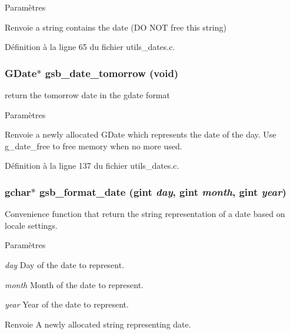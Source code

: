 \begin{DoxyParams}{Paramètres}
\item[{\em }]\end{DoxyParams}
\begin{DoxyReturn}{Renvoie}
a string contains the date (DO NOT free this string) 
\end{DoxyReturn}


Définition à la ligne 65 du fichier utils\_\-dates.c.

\subsubsection[{gsb\_\-date\_\-tomorrow}]{\setlength{\rightskip}{0pt plus 5cm}GDate$\ast$ gsb\_\-date\_\-tomorrow (void)}\label{utils__dates_8c_a527126308515106069bf3e5b2fc100ef}
return the tomorrow date in the gdate format


\begin{DoxyParams}{Paramètres}
\item[{\em }]\end{DoxyParams}
\begin{DoxyReturn}{Renvoie}
a newly allocated GDate which represents the date of the day. Use g\_\-date\_\-free to free memory when no more used. 
\end{DoxyReturn}


Définition à la ligne 137 du fichier utils\_\-dates.c.

\subsubsection[{gsb\_\-format\_\-date}]{\setlength{\rightskip}{0pt plus 5cm}gchar$\ast$ gsb\_\-format\_\-date (gint {\em day}, \/  gint {\em month}, \/  gint {\em year})}\label{utils__dates_8c_a6d8984b6159dab5d8f05b8da5b7509ed}
Convenience function that return the string representation of a date based on locale settings.


\begin{DoxyParams}{Paramètres}
\item[{\em day}]Day of the date to represent. \item[{\em month}]Month of the date to represent. \item[{\em year}]Year of the date to represent.\end{DoxyParams}
\begin{DoxyReturn}{Renvoie}
A newly allocated string representing date. 
\end{DoxyReturn}


